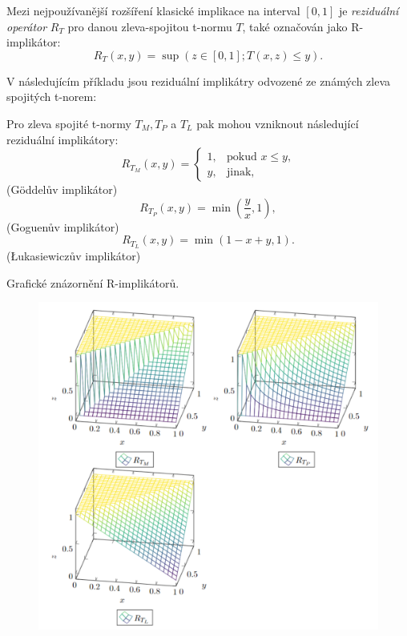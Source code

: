 Mezi nejpoužívanější rozšíření klasické implikace na interval $[0,1]$ je \textit{reziduální operátor} $R_T$ pro danou zleva-spojitou t-normu $T$, také označován jako R-implikátor: $$ R_T(x,y)=\sup(z \in [0,1]; T(x,z) \leq y).$$

V následujícím příkladu jsou rezidu\'aln\'i implik\'atry odvozen\'e ze zn\'am\'ych zleva spojit\'ych t-norem:
\begin{example} Pro zleva spojité t-normy $T_M, T_P$ a $T_L$ pak mohou vzniknout následující reziduální implikátory:
    \cite{Springer}\\
     $$ R_{T_M}(x,y)=\begin{cases} 1, &\mbox {pokud $x\leq y$,} \\y, &\mbox{jinak,} \end{cases} $$
    (Göddel\r uv implik\' ator)
     $$ R_{T_P}(x,y)=\min \left (\frac yx,1 \right ),$$
    (Goguen\r uv implikátor)
     $$ R_{T_L}(x,y)=\min(1-x+y,1).$$
    (\L{}ukasiewicz\r uv implikátor)\\
\end{example}
\begin{graph}
     Grafické znázornění R-implikátor\r u.\\
\begin{figure}[H]
                \hspace{-1cm}
                \includegraphics[scale=0.7]{template-fig/impl4.pdf}
                \centering
            \end{figure}
     

\end{graph}




